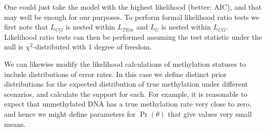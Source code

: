 \documentclass[12pt,longbibliography]{article}
\begin{document}
One could just take the model with the highest likelihood (better: AIC), and that may well be enough for our purposes. To perform formal likelihood ratio tests we first note that $L_{CG}$ is nested within $L_{TEm}$ and $L_{U}$ is nested within $L_{CG}$. Likelihood ratio tests can then be performed assuming the test statistic under the null is $\chi^2$-distributed 
with 1 degree of freedom.



We can likewise modify the likelihood calculations of methylation statuses to include distributions of error rates.
In this case we define distinct prior distributions for the expected distribution of true methylation under different scenarios, and calculate the support for each.
For example, it is reasonable to expect that unmethylated DNA has a true methylation rate very close to zero, and hence we might define parameters for $\Pr(\theta)$ that give values very small means.
\end{document}
